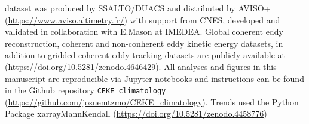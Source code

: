 \documentclass[draft,linenumbers]{agujournal2019}
\begin{document}
	\acknowledgments
	\citet{Chelton_mesoscale_2013} dataset was produced by SSALTO/DUACS and distributed by AVISO+ (\url{https://www.aviso.altimetry.fr/}) with support from CNES, developed and validated in collaboration with E.Mason at IMEDEA.
	Global coherent eddy reconstruction, coherent and non-conherent eddy kinetic energy datasets, in addition to gridded coherent eddy tracking datasets are publicly available at (\url{https://doi.org/10.5281/zenodo.4646429}). 
	All analyses and figures in this manuscript are reproducible via Jupyter notebooks and instructions can be found in the Github repository \texttt{CEKE\_climatology} (\url{https://github.com/josuemtzmo/CEKE_climatology}). Trends used the Python Package xarrayMannKendall (\url{https://doi.org/10.5281/zenodo.4458776})
	
	
	
\end{document}
